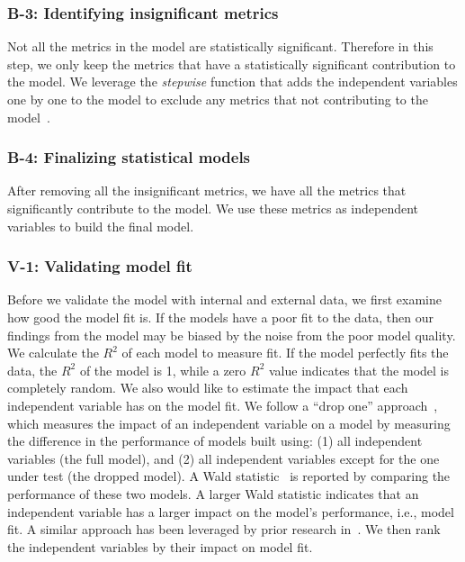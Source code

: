 \subsubsection{B-3: Identifying insignificant metrics}
Not all the metrics in the model are statistically significant. Therefore in this step, we only keep the metrics that have a statistically significant contribution to the model. We leverage the \textit{stepwise} function that adds the independent variables one by one to the model to exclude any metrics that not contributing to the model~\cite{RInAction}. 

\subsubsection{B-4: Finalizing statistical models}
After removing all the insignificant metrics, we have all the metrics that significantly contribute to the model. We use these metrics as independent variables to build the final model.

\subsubsection{V-1: Validating model fit}

Before we validate the model with internal and external data, we first examine how good the model fit is. If the models have a poor fit to the data, then our findings from the model may be biased by the noise from the poor model quality. We calculate the $R^2$ of each model to measure fit. If the model perfectly fits the data, the $R^2$ of the model is 1, while a zero $R^2$ value indicates that the model is completely random. We also would like to estimate the impact that each independent variable has on the model fit. We follow a ``drop one'' approach~\cite{Chambers1990}, which measures the impact of an independent variable on a model by measuring the difference in the performance of models built using: (1) all independent variables (the full model), and (2) all independent variables except for the one under test (the dropped model). A Wald statistic~\cite{harrell2015regression} is reported by comparing the performance of these two models. A larger Wald statistic indicates that an independent variable has a larger impact on the model's performance, i.e., model fit. A similar approach has been leveraged by prior research in~\cite{mcintosh2015emse}. We then rank the independent variables by their impact on model fit. 


